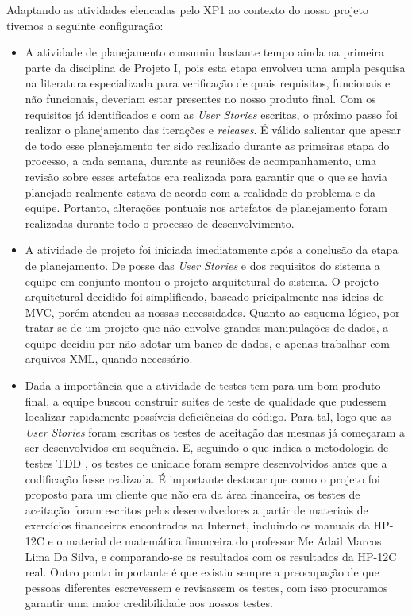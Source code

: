 Adaptando as atividades elencadas pelo XP1 ao contexto do nosso projeto tivemos a seguinte configuração: 
\begin{itemize}
 \item  A atividade de planejamento consumiu bastante tempo ainda na primeira parte da disciplina de Projeto I, pois esta etapa envolveu uma ampla pesquisa na literatura especializada para verificação de quais requisitos, funcionais e não funcionais, deveriam estar presentes no nosso produto final. Com os requisitos já identificados e com as \textit{User Stories} escritas, o próximo passo foi realizar o planejamento das iterações e \textit{releases}. É válido salientar que apesar de todo esse planejamento ter sido realizado durante as primeiras etapa do processo, a cada semana, durante as reuniões de acompanhamento, uma revisão sobre esses artefatos era realizada para garantir que o que se havia planejado realmente estava de acordo com a realidade do problema e da equipe. Portanto, alterações pontuais nos artefatos de planejamento foram realizadas durante todo o processo de desenvolvimento.
 \item A atividade de projeto foi iniciada imediatamente após a conclusão da etapa de planejamento. De posse das \textit{User Stories} e dos requisitos do sistema a equipe em conjunto montou o projeto arquitetural do sistema. O projeto arquitetural decidido foi simplificado, baseado pricipalmente nas ideias de MVC, porém atendeu as nossas necessidades. Quanto ao esquema lógico, por tratar-se de um projeto que não envolve grandes manipulações de dados, a equipe decidiu por não adotar um banco de dados, e apenas trabalhar com arquivos XML, quando necessário.
 \item Dada a importância que a atividade de testes tem para um bom produto final, a equipe buscou construir suites de teste de qualidade que pudessem localizar rapidamente possíveis deficiências do código. Para tal, logo que as \textit{User Stories} foram escritas os testes de aceitação das mesmas já começaram a ser desenvolvidos em sequência. E, seguindo o que indica a metodologia de testes TDD \cite{TDD}, os testes de unidade foram sempre desenvolvidos antes que a codificação fosse realizada. É importante destacar que como o projeto foi proposto para um cliente que não era da área financeira, os testes de aceitação foram escritos pelos desenvolvedores a partir de materiais de exercícios financeiros encontrados na Internet, incluindo os manuais da HP-12C e o material de matemática financeira do professor Me Adail Marcos Lima Da Silva, e comparando-se os resultados com os resultados da HP-12C real. Outro ponto importante é que existiu sempre a preocupação de que pessoas diferentes escrevessem e revisassem os testes, com isso procuramos garantir uma maior credibilidade aos nossos testes. 

\end{itemize}
